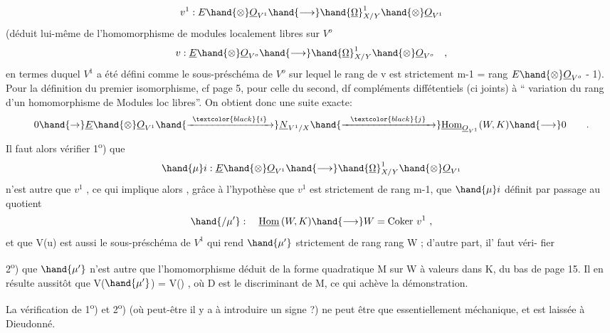 
\[ v^1 : E\hand{\otimes}\underline{O}_{V^1} \hand{\longrightarrow} \hand{\underline{\Omega}}^1_{X/Y}\hand{\otimes}\underline{O}_{V^1} \]
 (déduit  lui-même de l'homomorphisme de modules
localement libres sur $V^o$
\[ v : \underline{E}\hand{\otimes}\underline{O}_{V^o} \hand{\longrightarrow} \hand{\underline{\Omega}}^1_{X/Y}\hand{\otimes} \underline{O}_{V^o} \quad , \]
en termes duquel  $V^1$ a été défini comme le sous-préschéma de $V^o$ sur lequel
le rang de v est strictement \hand{$\leqslant$} m-1 = rang $E\hand{\otimes}\underline{O}_{V^o}$ - 1). Pour la définition
du premier isomorphisme, cf page 5, pour celle du second, df compléments
diffétentiels (ci joints) à `` variation du rang d'un homomorphisme de
Modules loc libres''. On obtient donc une suite exacte:
\[ 0 \hand{\to} \underline{E}\hand{\otimes}\underline{O}_{V^1} \hand{\xrightarrow{\ \textcolor{black}{i}\ }} \underline{N}_{V^1/X} \hand{\xrightarrow{\ \ \textcolor{black}{j}\ \ }} \underline{\mathrm{Hom}}_{\underline{O}_{V^1}}(W,K) \hand{\longrightarrow} 0 \qquad . \]
Il faut alors vérifier 
1\textsuperscript{o}) que
\[ \hand{\mu}i : \underline{E}\hand{\otimes}\underline{O}_{V^1} \hand{\longrightarrow} \hand{\underline{\Omega}}^1_{X/Y}\hand{\otimes}\underline{O}_{V^1} \]
n'est autre que $v^1$ , ce qui implique alors , grâce à l'hypothèse que
$v^1$ est strictement de rang m-1, que  $\hand{\mu}i$ définit par passage au
quotient
\[ \hand{/\mu'} : \quad \underline{\mathrm{Hom}}\,(W,K) \hand{\longrightarrow} W = \mathrm{Coker}\ v^1 \ , \]
et que V(u) est aussi le sous-préschéma de $V^1$ qui rend $\hand{\mu'}$ strictement
de rang \hand{\unsure{$<|\leqslant$}}rang W  ; d'autre part, il'  faut véri-%
fier

2\textsuperscript{o}) que $\hand{\mu'}$ n'est autre que l'homomorphisme déduit de la forme
quadratique  M sur W à valeurs dans K, du bas de page 15. Il en résulte
aussitôt que V($\hand{\mu'}$) = V() , où D est le discriminant de M, ce  qui
achève la démonstration.

La vérification de 1\textsuperscript{o}) et 2\textsuperscript{o}) (où peut-être il y a à introduire un
signe ?) ne peut être que essentiellement méchanique, et est laissée à
Dieudonné.

